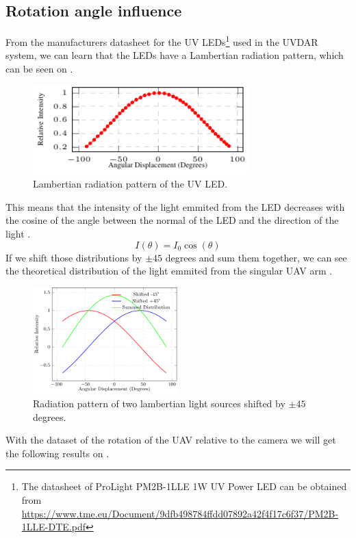 \subsection{Rotation angle influence}
From the manufacturers datasheet for the UV LEDs\footnote{The datasheet of ProLight PM2B-1LLE 1W UV Power LED can be obtained from \url{https://www.tme.eu/Document/9dfb498784ffdd07892a42f4f17c6f37/PM2B-1LLE-DTE.pdf}}
used in the UVDAR system, we can learn that the LEDs have a Lambertian radiation pattern,
which can be seen on .
\begin {figure}[H]
	\centering
	\includegraphics[width=0.75\textwidth]{./fig/semestral/lambertian/lambertian.pdf}
	\caption{Lambertian radiation pattern of the UV LED.}
	\label{fig:lambertian}
\end{figure}

This means that the intensity of the light emmited from the LED decreases with the cosine
of the angle between the normal of the LED and the direction of the light .
\begin{equation}
	I(\theta) = I_0\cos(\theta)
	\label{eq:lambertian}
\end{equation}
If we shift those distributions by $\pm 45$ degrees and sum them together, we can see the
theoretical distribution of the light emmited from the singular UAV arm .
\begin {figure}[H]
	\centering
	\includegraphics[width=0.50\textwidth]{./fig/semestral/lambertian/3lambertian.pdf}
	\caption{Radiation pattern of two lambertian light sources shifted by $\pm 45$ degrees.}
	\label{fig:lambert_combined}
\end{figure}
With the dataset of the rotation of the UAV relative to the camera we will get the following results
on .

